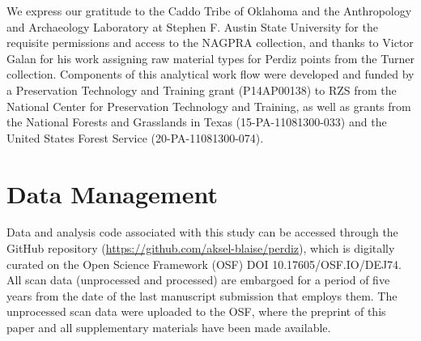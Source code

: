 \documentclass[review]{elsarticle}
\begin{document}
We express our gratitude to the Caddo Tribe of Oklahoma and the Anthropology and Archaeology Laboratory at Stephen F. Austin State University for the requisite permissions and access to the NAGPRA collection, and thanks to Victor Galan for his work assigning raw material types for Perdiz points from the Turner collection. Components of this analytical work flow were developed and funded by a Preservation Technology and Training grant (P14AP00138) to RZS from the National Center for Preservation Technology and Training, as well as grants from the National Forests and Grasslands in Texas (15-PA-11081300-033) and the United States Forest Service (20-PA-11081300-074).

\section*{Data Management}

Data and analysis code associated with this study can be accessed through the GitHub repository (\href{https://github.com/aksel-blaise/perdiz}{https://github.com/aksel-blaise/perdiz}), which is digitally curated on the Open Science Framework (OSF) DOI 10.17605/OSF.IO/DEJ74. All scan data (unprocessed and processed) are embargoed for a period of five years from the date of the last manuscript submission that employs them. The unprocessed scan data were uploaded to the OSF, where the preprint of this paper and all supplementary materials have been made available.


\end{document}
